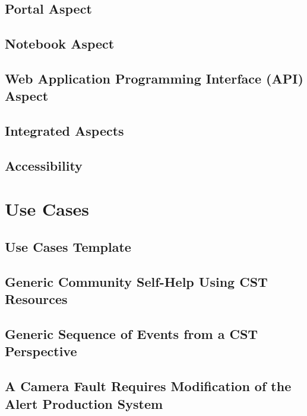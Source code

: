 \documentclass[DM,lsstdraft,authoryear,toc]{lsstdoc}
\begin{document}
\clearpage
\subsection{Portal Aspect}


\clearpage
\subsection{Notebook Aspect}


\clearpage
\subsection{Web Application Programming Interface (API) Aspect}


\clearpage
\subsection{Integrated Aspects}


\clearpage
\subsection{Accessibility}


\clearpage
\section{Use Cases}

\clearpage
\subsection{Use Cases Template}


\clearpage
\subsection{Generic Community Self-Help Using CST Resources}


\clearpage
\subsection{Generic Sequence of Events from a CST Perspective}


\clearpage
\subsection{A Camera Fault Requires Modification of the Alert Production System}

\end{document}
